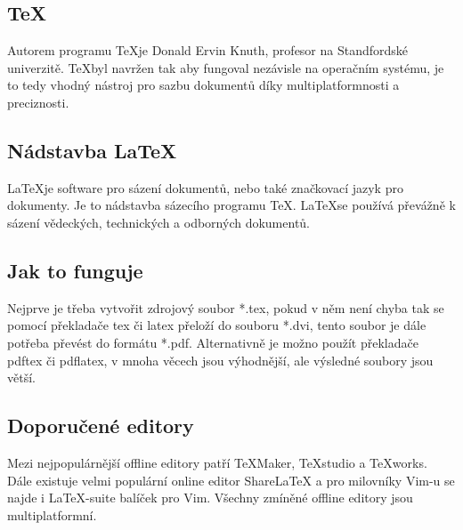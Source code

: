 \documentclass[11pt,a4paper]{article}
\begin{document}
\subsection{\TeX}
Autorem programu \TeX je Donald Ervin Knuth, profesor na Standfordské univerzitě.
\TeX byl navržen tak aby fungoval nezávisle na operačním systému, je to tedy vhodný nástroj pro sazbu dokumentů díky multiplatformnosti a preciznosti. \cite{beranova}

\subsection{Nádstavba \LaTeX}
\LaTeX je software pro sázení dokumentů, nebo také značkovací jazyk pro dokumenty. Je to nádstavba sázecího programu \TeX. \LaTeX se používá převážně k sázení vědeckých, technických a odborných dokumentů. \cite{kottwitz}

\subsection{Jak to funguje}
Nejprve je třeba vytvořit zdrojový soubor *.tex, pokud v něm není chyba tak se pomocí překladače tex či latex přeloží do souboru *.dvi, tento soubor je dále potřeba převést do formátu *.pdf. Alternativně je možno použít překladače pdftex či pdflatex, v mnoha věcech jsou výhodnější, ale výsledné soubory jsou větší. \cite{bojko}

\subsection{Doporučené editory}
Mezi nejpopulárnější offline editory patří TeXMaker, TeXstudio a TeXworks. Dále existuje velmi populární online editor ShareLaTeX a pro milovníky Vim-u se najde i LaTeX-suite balíček pro Vim. Všechny zmíněné offline editory jsou multiplatformní. \cite{beebom}

\newpage
\renewcommand{\refname}{Použitá literatura:}


\end{document}
